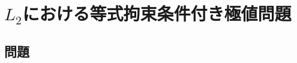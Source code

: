 \begin{enumerate}
\end{enumerate}

\newpage

\section{\(L_{2}\)における等式拘束条件付き極値問題} \label{section:2}

\subsection{問題}

